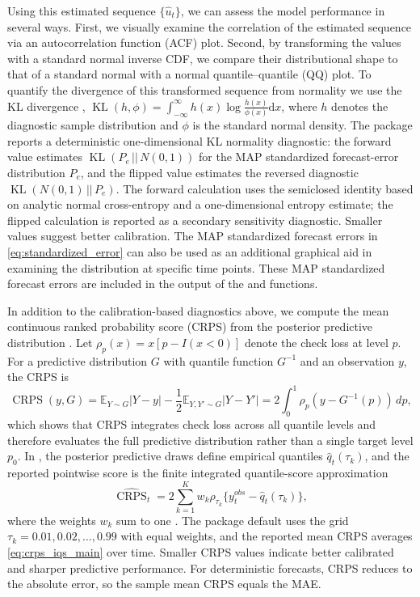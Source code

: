 \documentclass{jss}
\newcommand{\KL}{\operatorname{KL}}
\newcommand{\CRPS}{\operatorname{CRPS}}
\begin{document}
Using this estimated sequence $\{\hat u_t\}$, we can assess the model performance in several ways. First, we visually examine the correlation of the estimated sequence via an autocorrelation function (ACF) plot. Second, by transforming the values with a standard normal inverse CDF, we compare their distributional shape to that of a standard normal with a normal quantile--quantile (QQ) plot. To quantify the divergence of this transformed sequence from normality we use the KL divergence \citep{kullback1951information}, $\KL(h,\phi) = \int_{-\infty}^{\infty} h(x)\log \frac{h(x)}{\phi(x)}\mathrm{d}x$, where $h$ denotes the diagnostic sample distribution and $\phi$ is the standard normal density. The package reports a deterministic one-dimensional KL normality diagnostic: the forward value estimates $\KL(P_e\,||\,N(0,1))$ for the MAP standardized forecast-error distribution $P_e$, and the flipped value estimates the reversed diagnostic $\KL(N(0,1)\,||\,P_e)$. The forward calculation uses the semiclosed identity based on analytic normal cross-entropy and a one-dimensional entropy estimate; the flipped calculation is reported as a secondary sensitivity diagnostic. Smaller values suggest better calibration. The MAP standardized forecast errors in \eqref{eq:standardized_error} can also be used as an additional graphical aid in examining the distribution at specific time points. These MAP standardized forecast errors are included in the output of the  and  functions.

In addition to the calibration-based diagnostics above, we compute the mean continuous ranked probability score (CRPS) from the posterior predictive distribution \citep{gneiting2007}. Let $\rho_p(x)=x[p-I(x<0)]$ denote the check loss at level $p$. For a predictive distribution $G$ with quantile function $G^{-1}$ and an observation $y$, the CRPS is
\begin{equation}
\CRPS(y,G)=\mathbb{E}_{Y\sim G}|Y-y|-\frac{1}{2}\mathbb{E}_{Y,Y'\sim G}|Y-Y'|
=2\int_0^1 \rho_p\!\left(y-G^{-1}(p)\right)\,dp,
\label{eq:crps_main}
\end{equation}
which shows that CRPS integrates check loss across all quantile levels and therefore evaluates the full predictive distribution rather than a single target level \(p_0\). In , the posterior predictive draws define empirical quantiles \(\widehat q_t(\tau_k)\), and the reported pointwise score is the finite integrated quantile-score approximation
\begin{equation}
\widehat{\CRPS}_t
=
2\sum_{k=1}^{K} w_k
\rho_{\tau_k}\{y_t^{obs}-\widehat q_t(\tau_k)\},
\label{eq:crps_iqs_main}
\end{equation}
where the weights \(w_k\) sum to one \citep{laio2007verification}. The package default uses the grid \(\tau_k=0.01,0.02,\ldots,0.99\) with equal weights, and the reported mean CRPS averages \eqref{eq:crps_iqs_main} over time. Smaller CRPS values indicate better calibrated and sharper predictive performance. For deterministic forecasts, CRPS reduces to the absolute error, so the sample mean CRPS equals the MAE.
\end{document}
